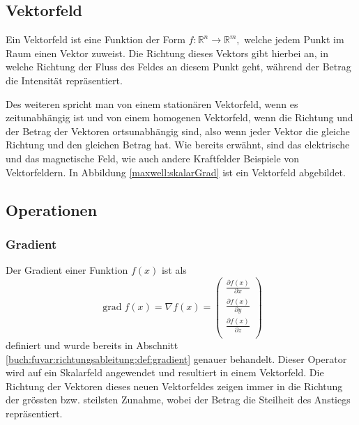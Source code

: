 \subsection{Vektorfeld\label{maxwell:vektorfeld}}

Ein Vektorfeld ist eine Funktion der Form \( f: \mathbb{R}^n \rightarrow \mathbb{R}^m, \) welche jedem Punkt im Raum einen Vektor zuweist. 
Die Richtung dieses Vektors gibt hierbei an, in welche Richtung der Fluss des Feldes an diesem Punkt geht, während der Betrag die Intensität repräsentiert.


Des weiteren spricht man von einem stationären Vektorfeld, wenn es zeitunabhängig ist und von einem homogenen Vektorfeld, wenn die Richtung und der Betrag der Vektoren ortsunabhängig sind, also wenn jeder Vektor die gleiche Richtung und den gleichen Betrag hat. 
Wie bereits erwähnt, sind das elektrische und das magnetische Feld, wie auch andere Kraftfelder Beispiele von Vektorfeldern.
In Abbildung \ref{maxwell:skalarGrad} ist ein Vektorfeld abgebildet.

\subsection{Operationen}

\subsubsection{Gradient}

Der Gradient einer Funktion $f(x)$ ist als 
\[
\renewcommand{\arraystretch}{1.9} 
\operatorname{grad}f(x) = \nabla f(x) = \begin{pmatrix}
\displaystyle
\frac{\partial f(x)}{\partial x} \\
\displaystyle
\frac{\partial f(x)}{\partial y} \\
\displaystyle
\frac{\partial f(x)}{\partial z} \\
\end{pmatrix}\] 
definiert und wurde bereits in Abschnitt \ref{buch:fuvar:richtungsableitung:def:gradient} genauer behandelt. Dieser Operator wird auf ein Skalarfeld angewendet und resultiert in einem Vektorfeld. 
Die Richtung der Vektoren dieses neuen Vektorfeldes zeigen immer in die Richtung der grössten bzw. steilsten Zunahme, wobei der Betrag die Steilheit des Anstiegs repräsentiert.

